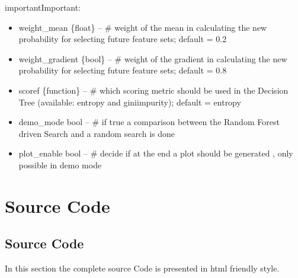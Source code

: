\documentclass[letterpaper,10pt,english]{sphinxmanual}
\begin{document}
\begin{sphinxadmonition}{important}{Important:}
\begin{fulllineitems}
\begin{itemize}
\item {} 
weight\_mean \{float\} -- \# weight of the mean in calculating the new probability for selecting future feature sets; default = 0.2

\item {} 
weight\_gradient \{bool\} -- \# weight of the gradient in calculating the new probability for selecting future feature sets; default = 0.8

\item {} 
scoref \{function\} -- \# which scoring metric should be used in the Decision Tree (available: entropy and giniimpurity); default = entropy

\item {} 
demo\_mode bool -- \# if true a comparison between the Random Forest driven Search and a random search is done

\item {} 
plot\_enable bool -- \# decide if at the end a plot should be generated , only possible in demo mode

\end{itemize}

\end{fulllineitems}

\end{sphinxadmonition}


\chapter{Source Code}
\label{\detokenize{index:source-code}}

\section{Source Code}
\label{\detokenize{SourceCode:source-code}}\label{\detokenize{SourceCode::doc}}\label{\detokenize{SourceCode:sourcecode}}
In this section the complete source Code is presented in html friendly style.
\end{document}
